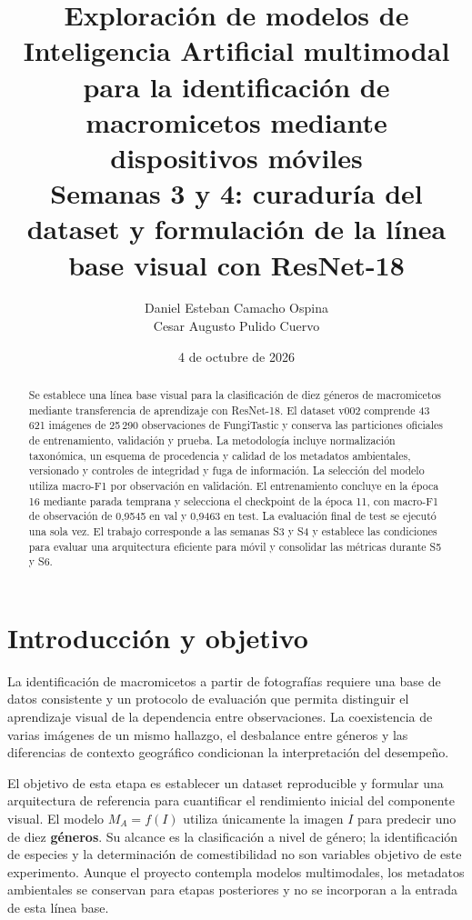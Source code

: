 \documentclass[11pt,a4paper]{article}
\title{\textbf{Exploración de modelos de Inteligencia Artificial multimodal\\
para la identificación de macromicetos mediante dispositivos móviles}\\[0.6em]
\normalsize Semanas 3 y 4: curaduría del dataset y formulación de la línea base visual con ResNet-18}
\author{Daniel Esteban Camacho Ospina\\Cesar Augusto Pulido Cuervo}
\date{4 de octubre de 2026}
\begin{document}
\maketitle

\begin{abstract}
Se establece una línea base visual para la clasificación de diez géneros de
macromicetos mediante transferencia de aprendizaje con ResNet-18. El dataset
v002 comprende 43\,621 imágenes de 25\,290 observaciones de FungiTastic y conserva
las particiones oficiales de entrenamiento, validación y prueba. La metodología
incluye normalización taxonómica, un esquema de procedencia y calidad de los
metadatos ambientales, versionado y controles de integridad y fuga de información.
La selección del modelo utiliza macro-F1 por observación en validación.
El entrenamiento concluye en la época 16 mediante parada temprana y selecciona
el checkpoint de la época 11, con macro-F1 de observación de 0,9545 en val y
0,9463 en test. La evaluación final de test se ejecutó una sola vez.
El trabajo corresponde a las semanas S3 y S4 y
establece las condiciones para evaluar una arquitectura eficiente para móvil
y consolidar las métricas durante S5 y S6.
\end{abstract}

\section{Introducción y objetivo}

La identificación de macromicetos a partir de fotografías requiere una base de
datos consistente y un protocolo de evaluación que permita distinguir el
aprendizaje visual de la dependencia entre observaciones. La coexistencia de
varias imágenes de un mismo hallazgo, el desbalance entre géneros y las diferencias
de contexto geográfico condicionan la interpretación del desempeño.

El objetivo de esta etapa es establecer un dataset reproducible y formular una
arquitectura de referencia para cuantificar el rendimiento inicial del componente
visual. El modelo \(M_A=f(I)\) utiliza únicamente la imagen \(I\) para predecir uno
de diez \textbf{géneros}. Su alcance es la clasificación a nivel de género;
la identificación de especies y la determinación de comestibilidad no son
variables objetivo de este experimento. Aunque el proyecto contempla modelos
multimodales, los metadatos ambientales se conservan para etapas posteriores y
no se incorporan a la entrada de esta línea base.
\end{document}
